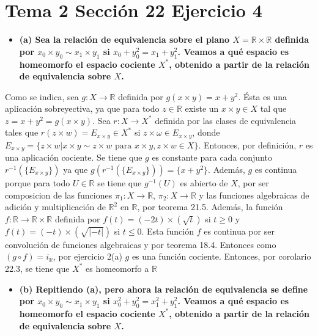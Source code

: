 \documentclass{article}
\begin{document}
\section{Tema 2 Sección 22 Ejercicio 4}
\begin{itemize}
\item \bf (a) \rm Sea la relación de equivalencia sobre el plano $X=\mathbb{R}\times \mathbb{R}$ definida por $x_0\times y_0\sim x_1\times y_1$ si $x_0+y_0^2=x_1+y_1^2$. Veamos a qué espacio es homeomorfo el espacio cociente $X^*$, obtenido a partir de la relación de equivalencia sobre $X$.
\end{itemize}
Como se indica, sea $g:X\rightarrow \mathbb{R}$ definida por $g(x\times y)=x+y^2$. Ésta es una aplicación sobreyectiva, ya que para todo $z\in \mathbb{R}$ existe un $x\times y \in X$ tal que $z= x+y^2=g(x\times y)$. Sea $r:X\rightarrow X^*$ definida por las clases de equivalencia tales que $r(z\times w)=E_{x\times y}\in X^*$ si  $z\times \omega\in E_{x\times y}$, donde $E_{x\times y}=\{z\times w| x\times y\sim z\times w \text{ para }x\times y,z\times w\in X\}$. Entonces, por definición, $r$ es una aplicación cociente. Se tiene que  $g$ es constante para cada conjunto $r^{-1}(\{E_{x\times y}\})$ ya que $g(r^{-1}(\{E_{x\times y}\}))=\{x+y^2\}$. Además, $g$ es continua porque para todo $U\in \mathbb{R}$ se tiene que $g^{-1}(U)$ es abierto de $X$, por ser composicion de las funciones $\pi_1:X\rightarrow \mathbb{R}$, $\pi_2:X\rightarrow \mathbb{R}$ y las funciones algebraicas de adición y multiplicación de $\mathbb{R}^2$ en $\mathbb{R}$, por teorema 21.5. Además, la función $f:\mathbb{R}\rightarrow \mathbb{R}\times \mathbb{R}$ definida por $f(t)=(-2t)\times ( \sqrt{t})$ si $t\geq 0$ y $f(t)=(-t)\times (\sqrt{|-t|})$ si $t\leq 0$. Esta función $f$ es continua por ser convolución de funciones algebraicas y por teorema 18.4. Entonces como $(g\circ f)=i_{\mathbb{R}}$, por ejercicio 2(a) $g$ es una función cociente. Entonces, por corolario 22.3, se tiene que $X^*$ es homeomorfo a $\mathbb{R}$
\begin{itemize}
\item \bf (b) \rm Repitiendo (a),  pero ahora la relación de equivalencia se define por $x_0\times y_0\sim x_1\times y_1$ si $x_0^2+y_0^2=x_1^2+y_1^2$. Veamos a qué espacio es homeomorfo el espacio cociente $X^*$, obtenido a partir de la relación de equivalencia sobre $X$.
\end{itemize}
\end{document}
